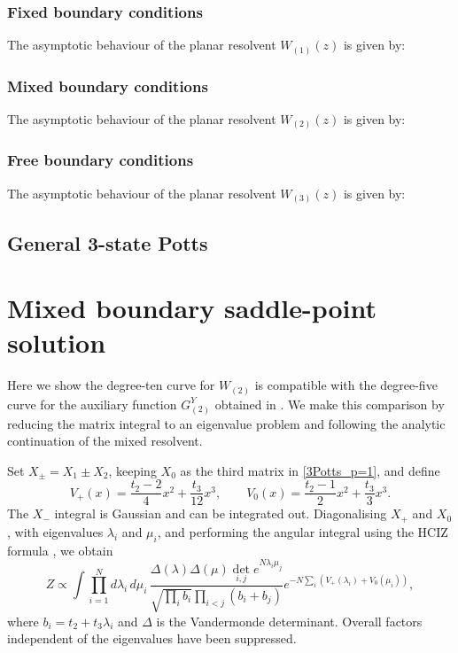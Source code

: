 \subsubsection{Fixed boundary conditions}

The asymptotic behaviour of the planar resolvent $W_{(1)}(z)$ is given by:
%


\subsubsection{Mixed boundary conditions}
\label{app:mixed-asymptotics}

The asymptotic behaviour of the planar resolvent $W_{(2)}(z)$ is given by:
%


\subsubsection{Free boundary conditions}

The asymptotic behaviour of the planar resolvent $W_{(3)}(z)$ is given by:
%


\subsection{General 3-state Potts}


\section{Mixed boundary saddle-point solution}
\label{app:mixed-saddle}

Here we show the degree-ten curve for $W_{(2)}$ is compatible with the degree-five curve for the
auxiliary function $G_{(2)}^Y$ obtained in \cite{Niedner:2016skw}. We make this comparison by
reducing the matrix integral to an eigenvalue problem and following the analytic continuation of
the mixed resolvent.

Set $X_\pm=X_1\pm X_2$, keeping $X_0$ as the third matrix in \eqref{3Potts_p=1}, and define
\begin{equation}
    V_+(x)=\frac{t_2-2}{4}x^2+\frac{t_3}{12}x^3,
    \qquad V_0(x)=\frac{t_2-1}{2}x^2+\frac{t_3}{3}x^3.
\end{equation}
The $X_-$ integral is Gaussian and can be integrated out. Diagonalising $X_+$ and $X_0$, with
eigenvalues $\lambda_i$ and $\mu_i$, and performing the angular integral using the HCIZ formula
\cite{Harish-Chandra538}, we obtain
\begin{equation}
    \label{MixedSaddle}
    Z\propto\int\prod_{i=1}^N d\lambda_i\,d\mu_i\,
    \frac{\Delta(\lambda)\Delta(\mu)\det_{i,j}e^{N\lambda_i\mu_j}}
    {\sqrt{\prod_i b_i}\prod_{i<j}(b_i+b_j)}
    e^{-N\sum_i\left(V_+(\lambda_i)+V_0(\mu_i)\right)},
\end{equation}
where $b_i=t_2+t_3\lambda_i$ and $\Delta$ is the Vandermonde determinant. Overall factors
independent of the eigenvalues have been suppressed.

